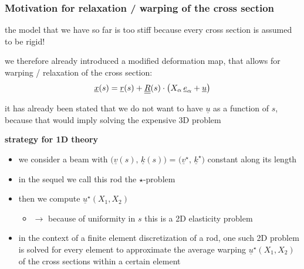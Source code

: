 \begin{frame}
  \frametitle{Motivation for relaxation / warping of the cross section}
  
  the model that we have so far is too stiff because every cross section is assumed to be rigid!

  \vspace{0.5em}
  we therefore already introduced a modified deformation map,
  that allows for warping / relaxation of the cross section:
  \begin{displaymath}
    \underline{x}(s) =
    \underline{r}(s) + \underline{\underline{R}}(s) \cdot \bigl( X_{\alpha} \, \underline{e}_{\alpha} + \underline{u} \bigr)
  \end{displaymath}
  
  
  it has already been stated that we do not want to have $\underline{u}$ as a function of $s$, \newline
  because that would imply solving the expensive 3D problem
  
  \vspace{0.8em}
  \textbf{strategy for 1D theory}
  \begin{itemize}
    \item we consider a beam with $\bigl( \underline{v}(s), \, \underline{k}(s) \bigr)$ = $\bigl( \underline{v}^{\star}, \, \underline{k}^{\star} \bigr)$ constant along its length
    \item in the sequel we call this rod the $\star$-problem
    \item then we compute $\underline{u}^{\star}(X_1,X_2)$
      \begin{itemize}
        \item $\rightarrow$ because of uniformity in $s$ this is a 2D elasticity problem
      \end{itemize}
    \item in the context of a finite element discretization of a rod, one such 2D problem is solved for every element to approximate the average warping $\underline{u}^{\star}(X_1,X_2)$ of the cross sections within a certain element
  \end{itemize}
  
  
\end{frame}


